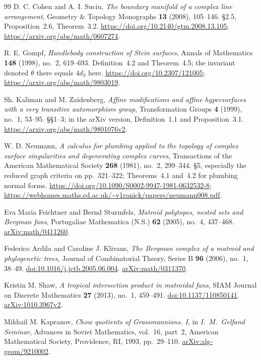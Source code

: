 \begin{thebibliography}{99}
D. C. Cohen and A. I. Suciu,
\emph{The boundary manifold of a complex line arrangement},
Geometry \& Topology Monographs \textbf{13} (2008), 105--146.
\S2.5, Proposition~2.6, Theorem~3.2.
\url{https://doi.org/10.2140/gtm.2008.13.105};
\url{https://arxiv.org/abs/math/0607274}.

R. E. Gompf,
\emph{Handlebody construction of Stein surfaces},
Annals of Mathematics \textbf{148} (1998), no.~2, 619--693.
Definition~4.2 and Theorem~4.5; the invariant denoted $\theta$ there equals $4d_3$ here.
\url{https://doi.org/10.2307/121005};
\url{https://arxiv.org/abs/math/9803019}.

Sh. Kaliman and M. Zaidenberg,
\emph{Affine modifications and affine hypersurfaces with a very transitive automorphism group},
Transformation Groups \textbf{4} (1999), no.~1, 53--95.
\S\S1--3; in the arXiv version, Definition~1.1 and Proposition~3.1.
\url{https://arxiv.org/abs/math/9801076v2}.

W. D. Neumann,
\emph{A calculus for plumbing applied to the topology of complex surface singularities
and degenerating complex curves},
Transactions of the American Mathematical Society \textbf{268} (1981), no.~2, 299--344.
\S5, especially the reduced graph criteria on pp.~321--322;
Theorems~4.1 and~4.2 for plumbing normal forms.
\url{https://doi.org/10.1090/S0002-9947-1981-0632532-8};
\url{https://webhomes.maths.ed.ac.uk/~v1ranick/papers/neumann008.pdf}.

Eva Maria Feichtner and Bernd Sturmfels,
\emph{Matroid polytopes, nested sets and Bergman fans},
Portugaliae Mathematica (N.S.) \textbf{62} (2005), no.~4, 437--468.
\href{https://arxiv.org/abs/math/0411260}{arXiv:math/0411260}.

Federico Ardila and Caroline J. Klivans,
\emph{The Bergman complex of a matroid and phylogenetic trees},
Journal of Combinatorial Theory, Series B \textbf{96} (2006), no.~1, 38--49.
\href{https://doi.org/10.1016/j.jctb.2005.06.004}{doi:10.1016/j.jctb.2005.06.004}.
\href{https://arxiv.org/abs/math/0311370}{arXiv:math/0311370}.

Kristin M. Shaw,
\emph{A tropical intersection product in matroidal fans},
SIAM Journal on Discrete Mathematics \textbf{27} (2013), no.~1, 459--491.
\href{https://doi.org/10.1137/110850141}{doi:10.1137/110850141}.
\href{https://arxiv.org/abs/1010.3967v2}{arXiv:1010.3967v2}.

Mikhail M. Kapranov,
\emph{Chow quotients of Grassmannians. I},
in \emph{I.~M.~Gelfand Seminar},
Advances in Soviet Mathematics, vol.~16, part~2,
American Mathematical Society, Providence, RI, 1993, pp.~29--110.
\href{https://arxiv.org/abs/alg-geom/9210002}{arXiv:alg-geom/9210002}.


\end{thebibliography}
